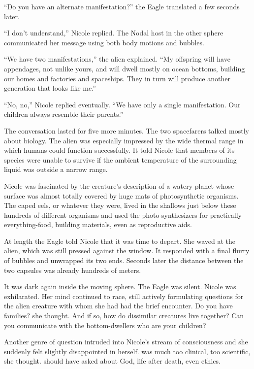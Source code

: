 \documentclass[]{article}
\begin{document}
{“Do you have an alternate manifestation?” the Eagle translated a few seconds later.

“I don’t understand,” Nicole replied.  The Nodal host in the other sphere communicated her message using both body motions and bubbles.

“We have two manifestations,” the alien explained.  “My offspring will have appendages, not unlike yours, and will dwell mostly on ocean bottoms, building our homes and factories and spaceships.  They in turn will produce another generation that looks like me.”

“No, no,” Nicole replied eventually.  “We have only a single manifestation.  Our children always resemble their parents.”

The conversation lasted for five more minutes.  The two spacefarers talked mostly about biology.  The alien was especially impressed by the wide thermal range in which humans could function successfully.  It told Nicole that members of its species were unable to survive if the ambient temperature of the surrounding liquid was outside a narrow range.

Nicole was fascinated by the creature’s description of a watery planet whose surface was almost totally covered by huge mats of photosynthetic organisms.  The caped eels, or whatever they were, lived in the shallows just below these hundreds of different organisms and used the photo-synthesizers for practically everything-food, building materials, even as reproductive aids.

At length the Eagle told Nicole that it was time to depart.  She waved at the alien, which was still pressed against the window.  It responded with a final flurry of bubbles and unwrapped its two ends.  Seconds later the distance between the two capsules was already hundreds of meters.

It was dark again inside the moving sphere.  The Eagle was silent.  Nicole was exhilarated.  Her mind continued to race, still actively formulating questions for the alien creature with whom she had had the brief encounter.  Do you have families? she thought.  And if so, how do dissimilar creatures live together? Can you communicate with the bottom-dwellers who are your children?

Another genre of question intruded into Nicole’s stream of consciousness and she suddenly felt slightly disappointed in herself.  was much too clinical, too scientific, she thought.  should have asked about God, life after death, even ethics.

}
\end{document}
